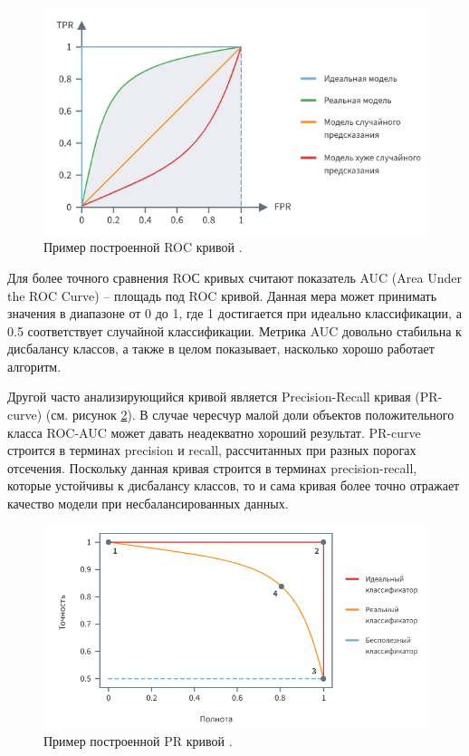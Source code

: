 \documentclass[a4paper,12pt]{extarticle}
\begin{document}
\begin{figure}[ht]
	\centering
	\includegraphics[scale=0.8]{roccurve.png}
	\caption{Пример построенной ROC кривой \cite{loginom}.}
	\label{fig:roccurve}
\end{figure}

Для более точного сравнения ROС кривых считают показатель AUC (Area Under the ROC Curve) – площадь под ROC кривой. Данная мера может принимать значения в диапазоне от 0 до 1, где 1 достигается при идеально классификации, а 0.5 соответствует случайной классификации. Метрика AUC довольно стабильна к дисбалансу классов, а также в целом показывает, насколько хорошо работает алгоритм.

Другой часто анализирующийся кривой является Precision-Recall кривая (PR-curve) (см. рисунок \ref{fig:prcurve}). В случае чересчур малой доли объектов положительного класса ROC-AUC может давать неадекватно хороший результат. PR-curve строится в терминах precision и recall, рассчитанных при разных порогах отсечения. Поскольку данная кривая строится в терминах precision-recall, которые устойчивы к дисбалансу классов, то и сама кривая более точно отражает качество модели при несбалансированных данных.

\begin{figure}[ht]
	\centering
	\includegraphics[scale=0.8]{prcurve.png}
	\caption{Пример построенной PR кривой \cite{loginom}.}
	\label{fig:prcurve}
\end{figure}
\end{document}
